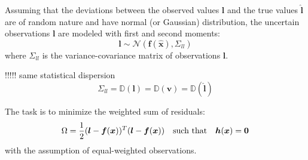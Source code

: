 Assuming that the deviations between the observed values $\boldsymbol l$ and the true values $\widehat{\boldsymbol l}$ are of random nature and have normal (or Gaussian) distribution, the uncertain observations $\boldsymbol l$ are modeled with first and second moments:
\begin{equation}
\boldsymbol l\sim\mathcal{N}(\boldsymbol f(\widehat{\boldsymbol x}) ,\mathsf{\Sigma}_{ll})
\end{equation}
where $\mathsf{\Sigma}_{ll}$ is the variance-covariance matrix of observations $\boldsymbol l$.

!!!!! same statistical dispersion
\begin{equation}
\mathsf{\Sigma}_{ll}=\mathbb{D}(\boldsymbol l)=\mathbb{D}(\boldsymbol v)=\mathbb{D}(\widehat{\boldsymbol l})
\end{equation}

The task is to minimize the weighted sum of residuals: %
\begin{equation}
\Omega=\dfrac{1}{2}(\boldsymbol l-\boldsymbol f(\boldsymbol x))^T(\boldsymbol l-\boldsymbol f(\boldsymbol x))\quad\textnormal{such that}\quad\boldsymbol h(\boldsymbol x)=\boldsymbol 0
\end{equation}
with the assumption of equal-weighted observations.

